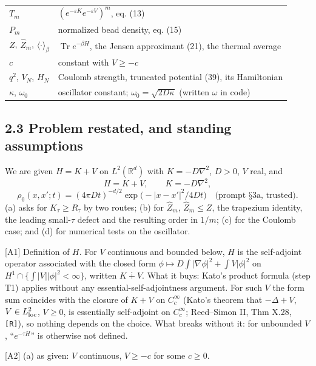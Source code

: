 \documentclass[11pt,a4paper]{article}
\begin{document}
\begin{longtable}[]{@{}
  >{\raggedright\arraybackslash}p{}
  >{\raggedright\arraybackslash}p{}@{}}
\(T_m\) & \((e^{-\varepsilon K}e^{-\varepsilon V})^m\), eq. (13) \\
\(P_m\) & normalized bead density, eq. (15) \\
\(Z\), \(\hat Z_m\), \(\langle\cdot\rangle_\beta\) & \(\operatorname{Tr}e^{-\beta H}\), the Jensen approximant (21), the thermal average \\
\(c\) & constant with \(V\ge -c\) \\
\(q^2\), \(V_N\), \(H_N\) & Coulomb strength, truncated potential (39), its Hamiltonian \\
\(\kappa\), \(\omega_0\) & oscillator constant; \(\omega_0=\sqrt{2D\kappa}\) (written \(\omega\) in code) \\
\end{longtable}

\hypertarget{problem-restated-and-standing-assumptions}{%
\subsection{2.3 Problem restated, and standing assumptions}\label{problem-restated-and-standing-assumptions}}

We are given \(H=K+V\) on \(L^2(\mathbb R^d)\) with \(K=-D\nabla^2\), \(D>0\), \(V\) real, and
\[H = K + V,\qquad K=-D\nabla^2, \tag{1}\]
\[\rho_0(x,x';t)=(4\pi Dt)^{-d/2}\exp\!\big(-|x-x'|^2/4Dt\big)\quad\text{(prompt §3a, trusted).}\tag{2}\]
(a) asks for \(K_\tau\ge R_\tau\) by two routes; (b) for \(\hat Z_m\), \(\hat Z_m\le Z\), the trapezium identity, the leading small-\(\tau\) defect and the resulting order in \(1/m\); (c) for the Coulomb case; and (d) for numerical tests on the oscillator.

{[}A1{]} Definition of \(H\). For \(V\) continuous and bounded below, \(H\) is the self-adjoint operator associated with the closed form \(\phi\mapsto D\int|\nabla\phi|^2+\int V|\phi|^2\) on \(H^1\cap\{\int|V||\phi|^2<\infty\}\), written \(K\dotplus V\). What it buys: Kato's product formula (step T1) applies without any essential-self-adjointness argument. For such \(V\) the form sum coincides with the closure of \(K+V\) on \(C_c^\infty\) (Kato's theorem that \(-\Delta+V\), \(V\in L^2_{\rm loc}\), \(V\ge0\), is essentially self-adjoint on \(C_c^\infty\); Reed--Simon II, Thm X.28, \texttt{[R]}), so nothing depends on the choice. What breaks without it: for unbounded \(V\), ``\(e^{-\tau H}\)'' is otherwise not defined.

{[}A2{]} (a) as given: \(V\) continuous, \(V\ge -c\) for some \(c\ge0\).
\end{document}
